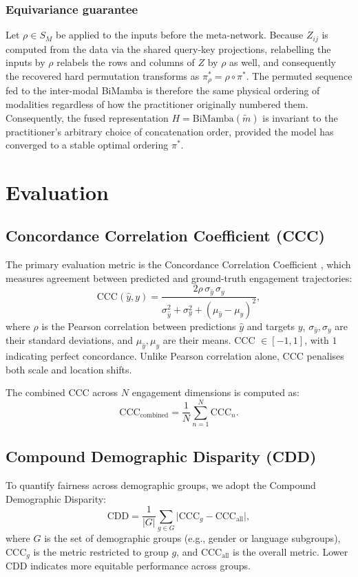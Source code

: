\documentclass[11pt,a4paper]{article}
\begin{document}
	\subsubsection*{Equivariance guarantee}
	Let $\rho \in S_M$ be applied to the inputs before the meta-network. Because $Z_{ij}$ is computed from the data via the shared query-key projections, relabelling the inputs by $\rho$ relabels the rows and columns of $Z$ by $\rho$ as well, and consequently the recovered hard permutation transforms as $\pi^*_\rho = \rho \circ \pi^*$. The permuted sequence fed to the inter-modal BiMamba is therefore the same physical ordering of modalities regardless of how the practitioner originally numbered them. Consequently, the fused representation $H = \text{BiMamba}(\tilde{m})$ is invariant to the practitioner's arbitrary choice of concatenation order, provided the model has converged to a stable optimal ordering $\pi^*$.
	
	\section{Evaluation}

	\subsection{Concordance Correlation Coefficient (CCC)}
	The primary evaluation metric is the Concordance Correlation Coefficient \cite{lin1989ccc}, which measures agreement between predicted and ground-truth engagement trajectories:
	$$
	\text{CCC}(\hat{y}, y) = \frac{2\rho\,\sigma_{\hat{y}}\,\sigma_y}{\sigma_{\hat{y}}^2 + \sigma_y^2 + (\mu_{\hat{y}} - \mu_y)^2},
	$$
	where $\rho$ is the Pearson correlation between predictions $\hat{y}$ and targets $y$, $\sigma_{\hat{y}}, \sigma_y$ are their standard deviations, and $\mu_{\hat{y}}, \mu_y$ are their means. CCC $\in [-1, 1]$, with $1$ indicating perfect concordance. Unlike Pearson correlation alone, CCC penalises both scale and location shifts.

	The combined CCC across $N$ engagement dimensions is computed as:
	$$
	\text{CCC}_{\text{combined}} = \frac{1}{N}\sum_{n=1}^{N} \text{CCC}_n.
	$$

	\subsection{Compound Demographic Disparity (CDD)}
	To quantify fairness across demographic groups, we adopt the Compound Demographic Disparity:
	$$
	\text{CDD} = \frac{1}{|G|}\sum_{g \in G} \bigl| \text{CCC}_g - \text{CCC}_{\text{all}} \bigr|,
	$$
	where $G$ is the set of demographic groups (e.g., gender or language subgroups), $\text{CCC}_g$ is the metric restricted to group $g$, and $\text{CCC}_{\text{all}}$ is the overall metric. Lower CDD indicates more equitable performance across groups.
\end{document}
